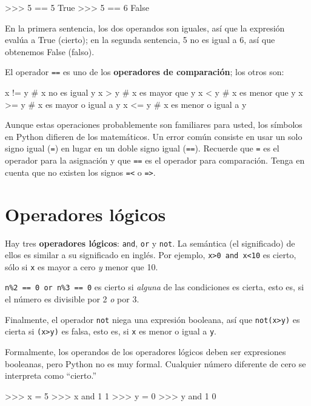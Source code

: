 \begin{pyconcode}
>>> 5 == 5
True
>>> 5 == 6
False
\end{pyconcode}
 En la primera sentencia, los dos operandos son iguales, así que la
expresión evalúa a True (cierto); en la segunda sentencia, 5 no es
igual a 6, así que obtenemos False (falso).

El operador \texttt{==} es uno de los \textbf{operadores de comparación};
los otros son:
\begin{pythoncode}
      x != y               # x no es igual y
      x > y                # x es mayor que y
      x < y                # x es menor que y
      x >= y               # x es mayor o igual a y
      x <= y               # x es menor o igual a y
\end{pythoncode}

Aunque estas operaciones probablemente son familiares para usted,
los símbolos en Python difieren de los matemáticos. Un error común
consiste en usar un solo signo igual (\texttt{=}) en lugar en un doble
signo igual (\texttt{==}). Recuerde que \texttt{=} es el operador
para la asignación y que \texttt{==} es el operador para comparación.
Tenga en cuenta que no existen los signos \texttt{=<} o \texttt{=>}.

\section{Operadores lógicos}

 

Hay tres \textbf{operadores lógicos}: \texttt{and}, \texttt{or} y
\texttt{not}. La semántica (el significado) de ellos es similar a
su significado en inglés. Por ejemplo, \texttt{x>0 and x<10} es cierto,
sólo si \texttt{x} es mayor a cero {\em y} menor que 10.

\texttt{n\%2 == 0 or n\%3 == 0} es cierto si {\em alguna} de las
condiciones es cierta, esto es, si el número es divisible por 2 {\em
o} por 3.

Finalmente, el operador \texttt{not} niega una expresión booleana,
así que \texttt{not(x>y)} es cierta si \texttt{(x>y)} es falsa, esto
es, si \texttt{x} es menor o igual a \texttt{y}.

Formalmente, los operandos de los operadores lógicos deben ser expresiones
booleanas, pero Python no es muy formal. Cualquier número diferente
de cero se interpreta como ``cierto.''
\begin{pyconcode}
>>>  x = 5
>>>  x and 1
1
>>>  y = 0
>>>  y and 1
0
\end{pyconcode}

